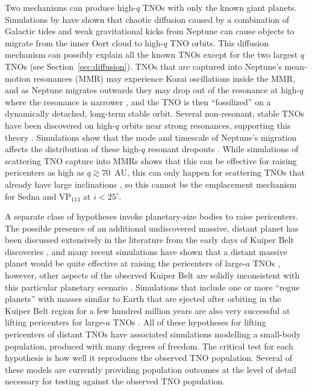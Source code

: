 \documentclass{aastex62}
\begin{document}
Two mechanisms can produce high-$q$ TNOs with only the known giant planets.
Simulations by \citet{bannister17} have shown that chaotic diffusion caused by a combination of Galactic tides and weak gravitational kicks from Neptune can cause objects to migrate from the inner Oort cloud to high-$q$ TNO orbits. 
This diffusion mechanism can possibly explain all the known TNOs except for the two largest $q$ TNOs (see Section~\ref{sec:diffusion}).
TNOs that are captured into Neptune's mean-motion resonances (MMR) may experience Kozai oscillations inside the MMR, and as Neptune migrates outwards they may drop out of the resonance at high-$q$ where the resonance is narrower \citep{gomes03}, and the TNO is then ``fossilized'' on a dynamically detached, long-term stable orbit.
Several non-resonant, stable TNOs have been discovered on high-$q$ orbits near strong resonances, supporting this theory \citep{pike15,lawler18res}.
Simulations show that the mode and timescale of Neptune's migration affects the distribution of these high-$q$ resonant dropouts \citep{Nesvornyetal2016,kaib16}.
While simulations of scattering TNO capture into MMRs shows that this can be effective for raising pericenters as high as $q\gtrsim70$~AU, this can only happen for scattering TNOs that already have large inclinations \citep{gallardo12}, so this cannot be the emplacement mechanism for Sedna and VP$_{113}$ at $i<25^{\circ}$.

A separate class of hypotheses invoke planetary-size bodies to raise pericenters.
The possible presence of an additional undiscovered massive, distant planet has been discussed extensively in the literature from the early days of Kuiper Belt discoveries \citep{gladman02,brownetal04,LykawkaMukai2008,soaresgomes13,trujillosheppard14}, and many recent simulations have shown that a distant massive planet would be quite effective at raising the pericenters of large-$a$ TNOs \citep{batyginbrown16,shankman17,lawler2017,Lietal2018}, however, other aspects of the observed Kuiper Belt are solidly inconsistent with this particular planetary scenario \citep{lawler2017,shankman17,shankman17bias}.  
Simulations that include one or more ``rogue planets'' with masses similar to Earth that are ejected after orbiting in the Kuiper Belt region for a few hundred million years are also very successful at lifting pericenters for large-$a$ TNOs \citep{gladmanchan06,silsbee18}.
All of these hypotheses for lifting pericenters of distant TNOs have associated simulations modelling a small-body population, produced with many degrees of freedom. 
The critical test for each hypothesis is how well it reproduces the observed TNO population. 
Several of these models are currently providing population outcomes at the level of detail necessary for testing against the observed TNO population.
\end{document}
